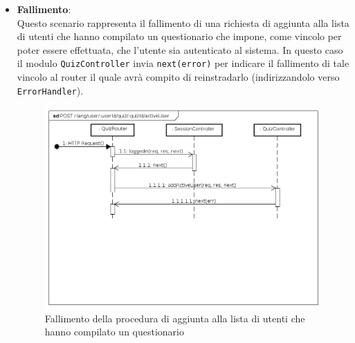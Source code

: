 \begin{itemize}
\item \textbf{Fallimento}:\\
Questo scenario rappresenta il fallimento di una richiesta di aggiunta alla lista di utenti che hanno compilato un questionario che impone, come vincolo per poter essere effettuata, che l'utente sia autenticato al sistema. In questo caso il modulo \texttt{QuizController} invia \texttt{next(error)} per indicare il fallimento di tale vincolo al router il quale avrà compito di reinstradarlo (indirizzandolo verso \texttt{ErrorHandler}).
\label{Fallimento della procedura di aggiunta alla lista di utenti che hanno compilato un questionario}
\begin{figure}[ht]
	\centering
	\includegraphics[scale=0.40]{UML/DiagrammiDiSequenza/Back-end/POST__lang_user_userId_quiz_quizId_activeUser_failure.png}
	\caption{Fallimento della procedura di aggiunta alla lista di utenti che hanno compilato un questionario}
\end{figure}
\FloatBarrier
\end{itemize}

